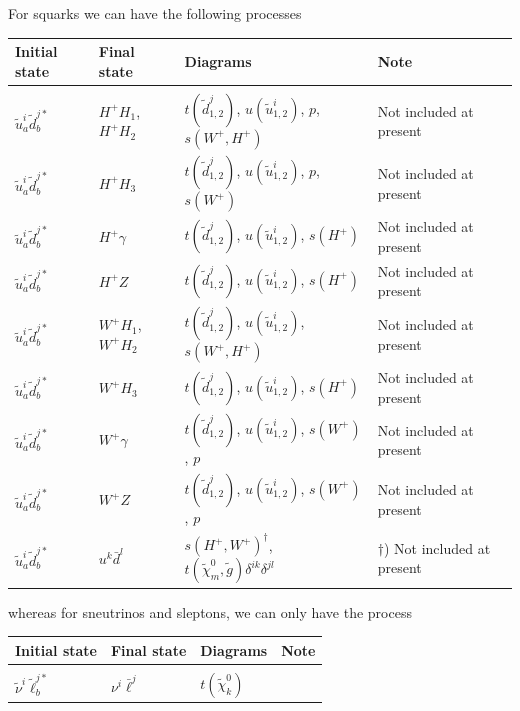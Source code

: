 \documentclass[a4paper,10pt,oneside]{book}
\newcommand{\tabspace}{\\[-2.5ex]}
\begin{document}
For squarks we can have the following processes

\begin{center}
\begin{tabular}{llll} \hline
{\bfseries Initial state} & {\bfseries Final state} &
{\bfseries Diagrams} & {\bfseries Note} \\ \hline \tabspace
$\tilde{u}^i_a \tilde{d}^{j*}_b$ & $H^+ H_1$, $H^+ H_2$ &
$t(\tilde{d}^j_{1,2})$, $u(\tilde{u}^i_{1,2})$, $p$, $s(W^+,H^+)$
& Not included at present \\
$\tilde{u}^i_a \tilde{d}^{j*}_b$ & $H^+ H_3$ &
$t(\tilde{d}^j_{1,2})$, $u(\tilde{u}^i_{1,2})$, $p$, $s(W^+)$
& Not included at present \\
$\tilde{u}^i_a \tilde{d}^{j*}_b$ & $H^+ \gamma$ &
$t(\tilde{d}^j_{1,2})$, $u(\tilde{u}^i_{1,2})$, $s(H^+)$
& Not included at present \\
$\tilde{u}^i_a \tilde{d}^{j*}_b$ & $H^+ Z$ &
$t(\tilde{d}^j_{1,2})$, $u(\tilde{u}^i_{1,2})$, $s(H^+)$
& Not included at present \\
$\tilde{u}^i_a \tilde{d}^{j*}_b$ & $W^+ H_1$, $W^+ H_2$  &
$t(\tilde{d}^j_{1,2})$, $u(\tilde{u}^i_{1,2})$, $s(W^+,H^+)$
& Not included at present \\
$\tilde{u}^i_a \tilde{d}^{j*}_b$ & $W^+ H_3$  &
$t(\tilde{d}^j_{1,2})$, $u(\tilde{u}^i_{1,2})$, $s(H^+)$
& Not included at present \\
$\tilde{u}^i_a \tilde{d}^{j*}_b$ & $W^+ \gamma$  &
$t(\tilde{d}^j_{1,2})$, $u(\tilde{u}^i_{1,2})$, $s(W^+)$, $p$
& Not included at present \\
$\tilde{u}^i_a \tilde{d}^{j*}_b$ & $W^+ Z$  &
$t(\tilde{d}^j_{1,2})$, $u(\tilde{u}^i_{1,2})$, $s(W^+)$, $p$
& Not included at present \\
$\tilde{u}^i_a \tilde{d}^{j*}_b$ & $u^k \bar{d}^l$ &
$s(H^+,W^+)^\dagger$, $t(\tilde{\chi}_m^0,\tilde{g})\delta^{ik}\delta^{jl}$
& $\dagger$) Not included at present \\ \hline
\end{tabular}
\end{center}

whereas for sneutrinos and sleptons, we can only have the process

\begin{center}
\begin{tabular}{llll} \hline
{\bfseries Initial state} & {\bfseries Final state} &
{\bfseries Diagrams} & {\bfseries Note} \\ \hline \tabspace
$\tilde{\nu}^i \tilde{\ell}^{j*}_b$ & $\nu^i \bar{\ell}^j$ &
$t(\tilde{\chi}_k^0)$ \\ \hline
\end{tabular}
\end{center}
\end{document}
